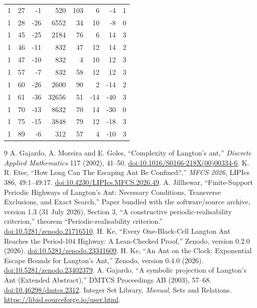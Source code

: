 \documentclass[11pt]{article}
\begin{document}
\begin{center}
\begin{longtable}{rrrrrrrr}
1 & 27 & -1 & 520 & 103 & 6 & -4 & 1 \\
1 & 28 & -26 & 6552 & 34 & 10 & -8 & 0 \\
1 & 45 & -25 & 2184 & 76 & 6 & 14 & 3 \\
1 & 46 & -11 & 832 & 47 & 12 & 14 & 2 \\
1 & 47 & -10 & 832 & 4 & 10 & 12 & 3 \\
1 & 57 & -7 & 832 & 58 & 12 & 12 & 3 \\
1 & 60 & -26 & 2600 & 90 & 2 & -14 & 2 \\
1 & 61 & -36 & 32656 & 51 & -14 & -40 & 3 \\
1 & 70 & -13 & 8632 & 70 & 14 & -30 & 0 \\
1 & 75 & -15 & 3848 & 79 & 12 & -18 & 3 \\
1 & 89 & -6 & 312 & 57 & 4 & -10 & 3 \\
\bottomrule
\end{longtable}
\end{center}

\begin{thebibliography}{9}
 A. Gajardo, A. Moreira and E. Goles,
``Complexity of Langton's ant,'' \emph{Discrete Applied Mathematics} 117
(2002), 41--50. \href{https://doi.org/10.1016/S0166-218X(00)00334-6}{doi:10.1016/S0166-218X(00)00334-6}.
 K. R. Etse, ``How Long Can The Escaping Ant Be Confined?,''
\emph{MFCS 2026}, LIPIcs 386, 49:1--49:17.
\href{https://doi.org/10.4230/LIPIcs.MFCS.2026.49}{doi:10.4230/LIPIcs.MFCS.2026.49}.
 A. Jillhewar, ``Finite-Support Periodic Highways of
Langton's Ant: Necessary Conditions, Transverse Exclusions, and Exact Search,''
Paper bundled with the software/source archive, version 1.3 (31 July 2026),
Section 3, ``A constructive periodic-realisability criterion,''
theorem ``Periodic-realisability criterion.''
\href{https://doi.org/10.5281/zenodo.21716510}{doi:10.5281/zenodo.21716510}.
 H. Ke, ``Every One-Black-Cell Langton Ant Reaches the
Period-104 Highway: A Lean-Checked Proof,'' Zenodo, version 0.2.0 (2026).
\href{https://doi.org/10.5281/zenodo.23341609}{doi:10.5281/zenodo.23341609}.
 H. Ke, ``An Ant on the Clock: Exponential Escape Bounds
for Langton's Ant,'' Zenodo, version 0.4.0 (2026).
\href{https://doi.org/10.5281/zenodo.23402379}{doi:10.5281/zenodo.23402379}.
 A. Gajardo, ``A symbolic projection of Langton's Ant
(Extended Abstract),'' DMTCS Proceedings AB (2003), 57--68.
\href{https://doi.org/10.46298/dmtcs.2312}{doi:10.46298/dmtcs.2312}.
 Integer Set Library, \emph{Manual}, Sets and Relations.
\url{https://libisl.sourceforge.io/user.html}.
\end{thebibliography}
\end{document}

